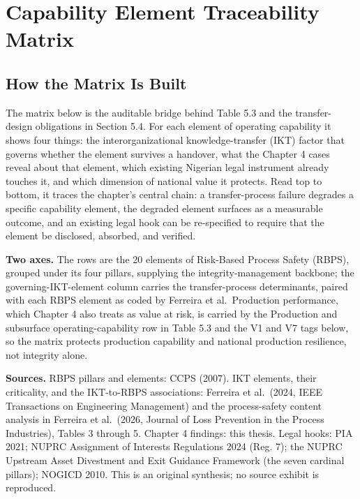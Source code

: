 \hypertarget{capability-element-traceability-matrix}{%
\chapter{Capability Element Traceability
Matrix}\label{capability-element-traceability-matrix}}

\hypertarget{how-the-matrix-is-built}{%
\section{How the Matrix Is Built}\label{how-the-matrix-is-built}}

The matrix below is the auditable bridge behind Table 5.3 and the
transfer-design obligations in Section 5.4. For each element of
operating capability it shows four things: the interorganizational
knowledge-transfer (IKT) factor that governs whether the element
survives a handover, what the Chapter 4 cases reveal about that element,
which existing Nigerian legal instrument already touches it, and which
dimension of national value it protects. Read top to bottom, it traces
the chapter's central chain: a transfer-process failure degrades a
specific capability element, the degraded element surfaces as a
measurable outcome, and an existing legal hook can be re-specified to
require that the element be disclosed, absorbed, and verified.

\textbf{Two axes.} The rows are the 20 elements of Risk-Based Process
Safety (RBPS), grouped under its four pillars, supplying the
integrity-management backbone; the governing-IKT-element column carries
the transfer-process determinants, paired with each RBPS element as
coded by Ferreira et al.~Production performance, which Chapter 4 also
treats as value at risk, is carried by the Production and subsurface
operating-capability row in Table 5.3 and the V1 and V7 tags below, so
the matrix protects production capability and national production
resilience, not integrity alone.

\textbf{Sources.} RBPS pillars and elements: CCPS (2007). IKT elements,
their criticality, and the IKT-to-RBPS associations: Ferreira et
al.~(2024, IEEE Transactions on Engineering Management) and the
process-safety content analysis in Ferreira et al.~(2026, Journal of
Loss Prevention in the Process Industries), Tables 3 through 5. Chapter
4 findings: this thesis. Legal hooks: PIA 2021; NUPRC Assignment of
Interests Regulations 2024 (Reg. 7); the NUPRC Upstream Asset Divestment
and Exit Guidance Framework (the seven cardinal pillars); NOGICD 2010.
This is an original synthesis; no source exhibit is reproduced.

